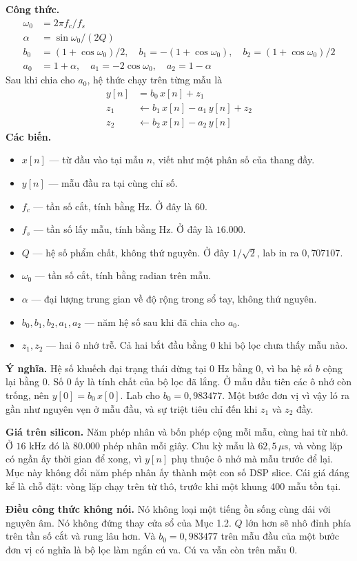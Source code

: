 \documentclass[11pt,a4paper]{article}
\begin{document}
\begin{equationcard}
\textbf{Công thức.}
\begin{align*}
\omega_0 &= 2\pi f_c / f_s \\
\alpha &= \sin\omega_0 / (2Q) \\
b_0 &= (1+\cos\omega_0)/2, \quad b_1 = -(1+\cos\omega_0), \quad b_2 = (1+\cos\omega_0)/2 \\
a_0 &= 1+\alpha, \quad a_1 = -2\cos\omega_0, \quad a_2 = 1-\alpha
\end{align*}
Sau khi chia cho $a_0$, hệ thức chạy trên từng mẫu là
\begin{align*}
y[n] &= b_0\, x[n] + z_1 \\
z_1 &\leftarrow b_1\, x[n] - a_1\, y[n] + z_2 \\
z_2 &\leftarrow b_2\, x[n] - a_2\, y[n]
\end{align*}
\textbf{Các biến.}
\begin{itemize}\setlength{\itemsep}{1pt}
    \item $x[n]$ --- từ đầu vào tại mẫu $n$, viết như một phân số của thang đầy.
    \item $y[n]$ --- mẫu đầu ra tại cùng chỉ số.
    \item $f_c$ --- tần số cắt, tính bằng Hz. Ở đây là $60$.
    \item $f_s$ --- tần số lấy mẫu, tính bằng Hz. Ở đây là $16.000$.
    \item $Q$ --- hệ số phẩm chất, không thứ nguyên. Ở đây $1/\sqrt{2}$, lab in ra $0{,}707107$.
    \item $\omega_0$ --- tần số cắt, tính bằng radian trên mẫu.
    \item $\alpha$ --- đại lượng trung gian về độ rộng trong sổ tay, không thứ nguyên.
    \item $b_0, b_1, b_2, a_1, a_2$ --- năm hệ số sau khi đã chia cho $a_0$.
    \item $z_1, z_2$ --- hai ô nhớ trễ. Cả hai bắt đầu bằng $0$ khi bộ lọc chưa thấy mẫu nào.
\end{itemize}
\textbf{Ý nghĩa.} Hệ số khuếch đại trạng thái dừng tại $0\text{ Hz}$ bằng 0, vì ba hệ số $b$ cộng lại bằng 0. Số 0 ấy là tính chất của bộ lọc đã lắng. Ở mẫu đầu tiên các ô nhớ còn trống, nên $y[0] = b_0\, x[0]$. Lab cho $b_0 = 0{,}983477$. Một bước đơn vị vì vậy ló ra gần như nguyên vẹn ở mẫu đầu, và sự triệt tiêu chỉ đến khi $z_1$ và $z_2$ đầy.

\textbf{Giá trên silicon.} Năm phép nhân và bốn phép cộng mỗi mẫu, cùng hai từ nhớ. Ở $16\text{ kHz}$ đó là $80.000$ phép nhân mỗi giây. Chu kỳ mẫu là $62{,}5\,\mu\text{s}$, và vòng lặp có ngần ấy thời gian để xong, vì $y[n]$ phụ thuộc ô nhớ mà mẫu trước để lại. Mục này không đổi năm phép nhân ấy thành một con số DSP slice. Cái giá đáng kể là chỗ đặt: vòng lặp chạy trên từ thô, trước khi một khung 400 mẫu tồn tại.

\textbf{Điều công thức không nói.} Nó không loại một tiếng ồn sống cùng dải với nguyên âm. Nó không đứng thay cửa sổ của Mục 1.2. $Q$ lớn hơn sẽ nhô đỉnh phía trên tần số cắt và rung lâu hơn. Và $b_0 = 0{,}983477$ trên mẫu đầu của một bước đơn vị có nghĩa là bộ lọc làm ngắn cú va. Cú va vẫn còn trên mẫu 0.
\end{equationcard}
\end{document}
